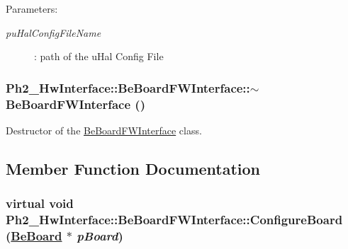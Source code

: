 \begin{Desc}
\item[Parameters:]
\begin{description}
\item[{\em pu\-Hal\-Config\-File\-Name}]: path of the u\-Hal Config File \end{description}
\end{Desc}
\hypertarget{class_ph2___hw_interface_1_1_be_board_f_w_interface_22077ee1db6eb5ae149165bff88b5fa0}{
\subsubsection[$\sim$BeBoardFWInterface]{\setlength{\rightskip}{0pt plus 5cm}Ph2\_\-Hw\-Interface::Be\-Board\-FWInterface::$\sim$Be\-Board\-FWInterface ()}}
\label{class_ph2___hw_interface_1_1_be_board_f_w_interface_22077ee1db6eb5ae149165bff88b5fa0}


Destructor of the \hyperlink{class_ph2___hw_interface_1_1_be_board_f_w_interface}{Be\-Board\-FWInterface} class. 



\subsection{Member Function Documentation}
\hypertarget{class_ph2___hw_interface_1_1_be_board_f_w_interface_b8836074e2dc8f3afb211479119390fc}{
\subsubsection[ConfigureBoard]{\setlength{\rightskip}{0pt plus 5cm}virtual void Ph2\_\-Hw\-Interface::Be\-Board\-FWInterface::Configure\-Board (\hyperlink{class_ph2___hw_description_1_1_be_board}{Be\-Board} $\ast$ {\em p\-Board})}}
\label{class_ph2___hw_interface_1_1_be_board_f_w_interface_b8836074e2dc8f3afb211479119390fc}



